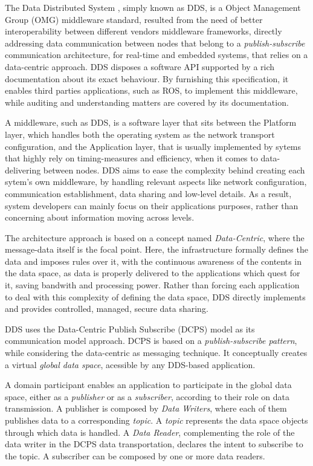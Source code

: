 The Data Distributed System \cite{3}, simply known as DDS, is a Object Management Group (OMG) middleware standard, resulted from the need of better interoperability between different vendors middleware frameworks, directly addressing data communication between nodes that belong to a \textit{publish-subscribe} communication architecture, for real-time and embedded systems, that relies on a data-centric approach. DDS disposes a software API supported by a rich documentation about its exact behaviour. By furnishing this specification, it enables third parties applications, such as ROS, to implement this middleware, while auditing and understanding matters are covered by its documentation.
            
A middleware, such as DDS, is a software layer that sits between the Platform layer, which handles both the operating system as the network transport configuration, and the Application layer, that is usually implemented by sytems that highly rely on timing-measures and efficiency, when it comes to data-delivering between nodes. DDS aims to ease the complexity behind creating each sytem's own middleware, by handling relevant aspects like network configuration, communication establishment, data sharing and low-level details. As a result, system developers can mainly focus on their applications purposes, rather than concerning about information moving across levels. 

The architecture approach is based on a concept named \textit{Data-Centric}, where the message-data itself is the focal point. Here, the infrastructure formally defines the data and imposes rules over it, with the continuous awareness of the contents in the data space, as data is properly delivered to the applications which quest for it, saving bandwith and processing power. \cite{3} Rather than forcing each application to deal with this complexity of defining the data space, DDS directly implements and provides controlled, managed, secure data sharing. \cite{pardo2005introduction}

DDS uses the Data-Centric Publish Subscribe (DCPS) model as its communication model approach. DCPS is based on a \textit{publish-subscribe pattern}, while considering the data-centric as messaging technique. It conceptually creates a virtual \textit{global data space}, acessible by any DDS-based application. \cite{maruyama2016exploring}

A domain participant enables an application to participate in the global data space, either as a \textit{publisher} or as a \textit{subscriber}, according to their role on data transmission. A publisher is composed by \textit{Data Writers}, where each of them publishes data to a corresponding \textit{topic}. A \textit{topic} represents the data space objects through which data is handled. A \textit{Data Reader}, complementing the role of the data writer in the DCPS data transportation, declares the intent to subscribe to the topic. A subscriber can be composed by one or more data readers. \cite{maruyama2016exploring, dcps-rtps}

